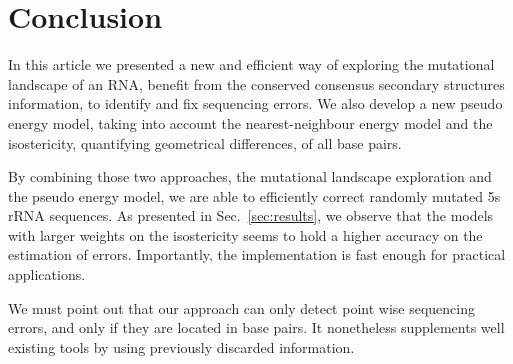 \section{Conclusion}
\label{sec:conclusion}

In this article we presented a new and efficient way of
exploring the mutational landscape of an RNA, benefit from the
 conserved consensus secondary structures  information,
to identify and fix sequencing errors. We also develop a new
 pseudo energy model, taking into account the nearest-neighbour energy model 
and the isostericity,  quantifying geometrical differences, of all base pairs. 

By combining those two approaches,  the 
mutational landscape exploration and the pseudo energy model,
 we are able  to efficiently 
correct randomly mutated 5s rRNA sequences. 
As presented in Sec.~\ref{sec:results},
we observe that the models
with larger weights on the
isostericity seems to hold a higher accuracy on the estimation of errors.
Importantly, the implementation is fast enough for practical applications.

We must point out that our approach can only detect point wise 
sequencing errors, and only if they are located in base pairs. It 
nonetheless supplements well existing tools by using previously discarded
information.

